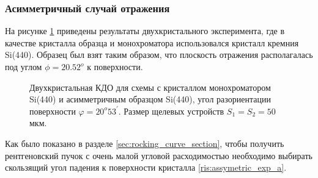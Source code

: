   \subsubsection{Асимметричный случай отражения}
  На рисунке \ref{ris:assymetric_exp_50}
  приведены результаты двухкристального эксперимента, где в качестве
  кристалла образца и монохроматора использовался кристалл кремния Si(440). Образец был взят таким
  образом, что плоскость отражения располагалась под углом $\phi = 20.52^o$ к поверхности.

  \begin{figure}[H]
    \centering
    \hfill
    \caption{Двухкристальная КДО для схемы с кристаллом монохроматором Si(440) и асимметричным образцом Si(440),
    угол разориентации поверхности $\varphi = 20^o53^{'}$. Размер щелевых устройств $S_1 = S_2 = 50$ мкм.}
    \label{ris:assymetric_exp_50}
  \end{figure}

  Как было показано в разделе \ref{sec:rocking_curve_section}, чтобы получить
  рентгеновский пучок с очень малой угловой расходимостью необходимо выбирать
  скользящий угол падения к поверхности кристалла \ref{ris:assymetric_exp_a}.

